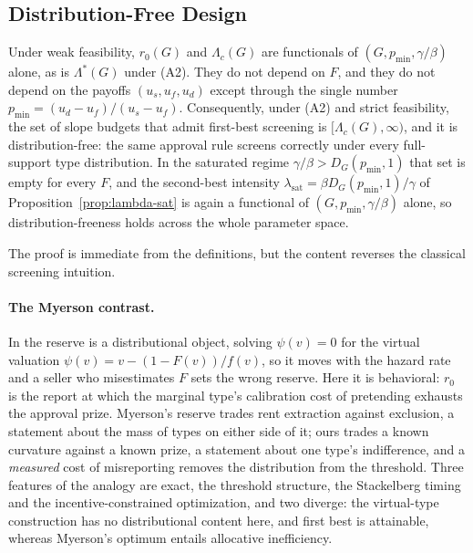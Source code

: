 \documentclass[acmsmall,nonacm,screen]{acmart}
\theoremstyle{acmplain}%
\theoremstyle{acmdefinition}%
\numberwithin{equation}{section}
\begin{document}
\subsection{Distribution-Free Design}

\begin{proposition}\label{prop:f-free}
Under weak feasibility, $r_0(G)$ and $\Lambda_c(G)$ are functionals of $(G,p_{\min},\gamma/\beta)$ alone, as is $\Lambda^*(G)$ under (A2). They do not depend on $F$, and they do not depend on the payoffs $(u_s,u_f,u_d)$ except through the single number $p_{\min} = (u_d-u_f)/(u_s-u_f)$. Consequently, under (A2) and strict feasibility, the set of slope budgets that admit first-best screening is $[\Lambda_c(G),\infty)$, and it is distribution-free: the same approval rule screens correctly under every full-support type distribution. In the saturated regime $\gamma/\beta > D_G(p_{\min},1)$ that set is empty for every $F$, and the second-best intensity $\lambda_{\mathrm{sat}} = \beta D_G(p_{\min},1)/\gamma$ of Proposition~\ref{prop:lambda-sat} is again a functional of $(G,p_{\min},\gamma/\beta)$ alone, so distribution-freeness holds across the whole parameter space.
\end{proposition}

The proof is immediate from the definitions, but the content reverses the classical screening intuition.

\paragraph{The Myerson contrast.}
In \citet{myerson1981optimal} the reserve is a distributional object, solving $\psi(v) = 0$ for the virtual valuation $\psi(v) = v - (1-F(v))/f(v)$, so it moves with the hazard rate and a seller who misestimates $F$ sets the wrong reserve. Here it is behavioral: $r_0$ is the report at which the marginal type's calibration cost of pretending exhausts the approval prize. Myerson's reserve trades rent extraction against exclusion, a statement about the mass of types on either side of it; ours trades a known curvature against a known prize, a statement about one type's indifference, and a \emph{measured} cost of misreporting removes the distribution from the threshold. Three features of the analogy are exact, the threshold structure, the Stackelberg timing and the incentive-constrained optimization, and two diverge: the virtual-type construction has no distributional content here, and first best is attainable, whereas Myerson's optimum entails allocative inefficiency.
\end{document}
